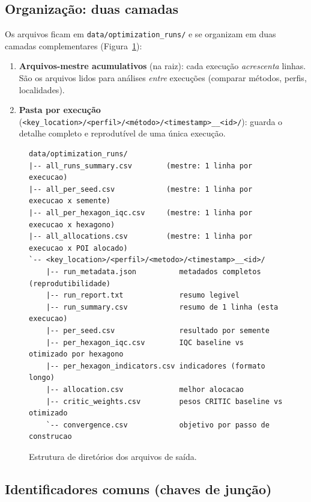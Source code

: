 \documentclass[11pt,a4paper]{article}
\begin{document}
\subsection{Organização: duas camadas}

Os arquivos ficam em \texttt{data/optimization\_runs/} e se organizam em duas
camadas complementares (Figura~\ref{fig:tree}):

\begin{enumerate}
\item \textbf{Arquivos-mestre acumulativos} (na raiz): cada execução
\emph{acrescenta} linhas. São os arquivos lidos para análises \emph{entre}
execuções (comparar métodos, perfis, localidades).
\item \textbf{Pasta por execução}
(\texttt{<key\_location>/<perfil>/<método>/<timestamp>\_\_<id>/}): guarda o detalhe
completo e reprodutível de uma única execução.
\end{enumerate}

\begin{figure}[ht]
\centering
\begin{lstlisting}[basicstyle=\ttfamily\footnotesize,frame=single,
  backgroundcolor=\color{codebg},rulecolor=\color{gray!40}]
data/optimization_runs/
|-- all_runs_summary.csv        (mestre: 1 linha por execucao)
|-- all_per_seed.csv            (mestre: 1 linha por execucao x semente)
|-- all_per_hexagon_iqc.csv     (mestre: 1 linha por execucao x hexagono)
|-- all_allocations.csv         (mestre: 1 linha por execucao x POI alocado)
`-- <key_location>/<perfil>/<metodo>/<timestamp>__<id>/
    |-- run_metadata.json          metadados completos (reprodutibilidade)
    |-- run_report.txt             resumo legivel
    |-- run_summary.csv            resumo de 1 linha (esta execucao)
    |-- per_seed.csv               resultado por semente
    |-- per_hexagon_iqc.csv        IQC baseline vs otimizado por hexagono
    |-- per_hexagon_indicators.csv indicadores (formato longo)
    |-- allocation.csv             melhor alocacao
    |-- critic_weights.csv         pesos CRITIC baseline vs otimizado
    `-- convergence.csv            objetivo por passo de construcao
\end{lstlisting}
\caption{Estrutura de diretórios dos arquivos de saída.}
\label{fig:tree}
\end{figure}

\subsection{Identificadores comuns (chaves de junção)}
\end{document}

